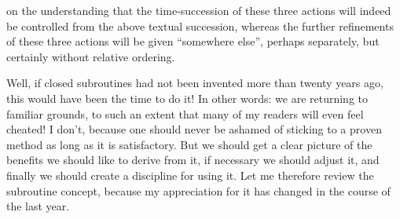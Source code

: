 \documentclass[twoside,11pt]{book}
\begin{document}
\noindent
on the understanding that the time-succession of these three actions will indeed be controlled from the above textual succession, whereas the further refinements of these three actions will be given ``somewhere else'', perhaps separately, but certainly without relative ordering.

Well, if closed subroutines had not been invented more than twenty years ago, this would have been the time to do it! In other words: we are returning to familiar grounds, to such an extent that many of my readers will even feel cheated! I don't, because one should never be ashamed of sticking to a proven method as long as it is satisfactory. But we should get a clear picture of the benefits we should like to derive from it, if necessary we should adjust it, and finally we should create a discipline for using it. Let me therefore review the subroutine concept, because my appreciation for it has changed in the course of the last year.
\end{document}
